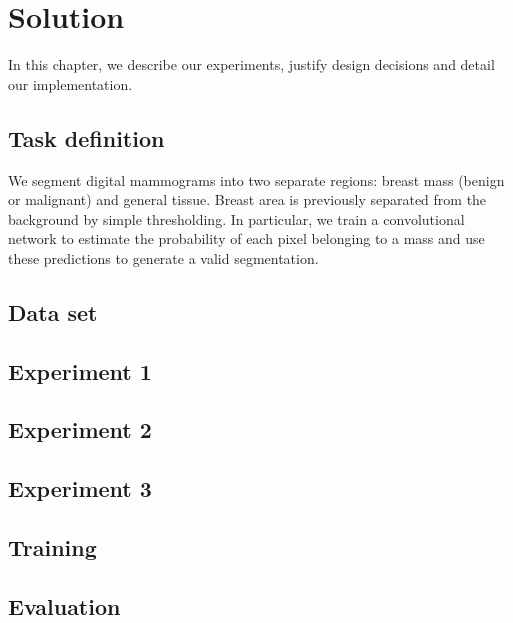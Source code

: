 \chapter{Solution}
\label{ch:Model}

In this chapter, we describe our experiments, justify design decisions and detail our implementation.


\section{Task definition}
We segment digital mammograms into two separate regions: breast mass (benign or malignant) and general tissue.
Breast area is previously separated from the background by simple thresholding.
In particular, we train a convolutional network to estimate the probability of each pixel belonging to a mass and use these predictions to generate a valid segmentation.

\section{Data set}


\section{Experiment 1}
\label{sec:Experiment1}


\section{Experiment 2}
\label{sec:Experiment2}


\section{Experiment 3}
\label{sec:Experiment3}


\section{Training}


\section{Evaluation}


